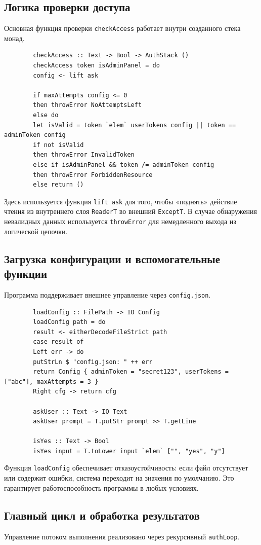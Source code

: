 \documentclass[a4paper, final]{article}
\begin{document}
	\subsection{Логика проверки доступа}
	Основная функция проверки \texttt{checkAccess} работает внутри созданного стека монад.
	
	\begin{lstlisting}
		checkAccess :: Text -> Bool -> AuthStack ()
		checkAccess token isAdminPanel = do
		config <- lift ask
		
		if maxAttempts config <= 0
		then throwError NoAttemptsLeft
		else do
		let isValid = token `elem` userTokens config || token == adminToken config
		if not isValid
		then throwError InvalidToken
		else if isAdminPanel && token /= adminToken config
		then throwError ForbiddenResource
		else return ()
	\end{lstlisting}
	Здесь используется функция \texttt{lift ask} для того, чтобы «поднять» действие чтения из внутреннего слоя \texttt{ReaderT} во внешний \texttt{ExceptT}. В случае обнаружения невалидных данных используется \texttt{throwError} для немедленного выхода из логической цепочки.
	
	\subsection{Загрузка конфигурации и вспомогательные функции}
	Программа поддерживает внешнее управление через \texttt{config.json}.
	
	\begin{lstlisting}
		loadConfig :: FilePath -> IO Config
		loadConfig path = do
		result <- eitherDecodeFileStrict path
		case result of
		Left err -> do
		putStrLn $ "config.json: " ++ err
		return Config { adminToken = "secret123", userTokens = ["abc"], maxAttempts = 3 }
		Right cfg -> return cfg
		
		askUser :: Text -> IO Text
		askUser prompt = T.putStr prompt >> T.getLine
		
		isYes :: Text -> Bool
		isYes input = T.toLower input `elem` ["", "yes", "y"]
	\end{lstlisting}
	Функция \texttt{loadConfig} обеспечивает отказоустойчивость: если файл отсутствует или содержит ошибки, система переходит на значения по умолчанию. Это гарантирует работоспособность программы в любых условиях.
	
	\subsection{Главный цикл и обработка результатов}
	Управление потоком выполнения реализовано через рекурсивный \texttt{authLoop}.
	
\end{document}
